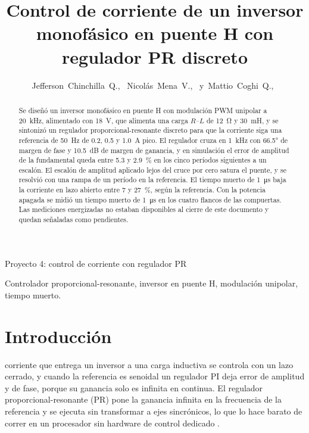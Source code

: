 \documentclass[journal]{IEEEtran}
\begin{document}
\deactivatequoting
\title{Control de corriente de un inversor monofásico en puente H con regulador PR discreto}

\author{Jefferson~Chinchilla~Q.,~
	Nicolás~Mena~V.,~
	y~Mattio~Coghi~Q.,~
}

%
{Proyecto 4: control de corriente con regulador PR}

\maketitle

\begin{abstract}
	Se diseñó un inversor monofásico en puente H con modulación PWM unipolar a \SI{20}{kHz}, alimentado con \SI{18}{V}, que alimenta una carga $R$--$L$ de \SI{12}{\ohm} y \SI{30}{mH}, y se sintonizó un regulador proporcional-resonante discreto para que la corriente siga una referencia de \SI{50}{Hz} de \num{0.2}, \num{0.5} y \SI{1.0}{A} pico. El regulador cruza en \SI{1}{kHz} con \ang{66.5} de margen de fase y \SI{10.5}{dB} de margen de ganancia, y en simulación el error de amplitud de la fundamental queda entre \num{5.3} y \SI{2.9}{\percent} en los cinco períodos siguientes a un escalón. El escalón de amplitud aplicado lejos del cruce por cero satura el puente, y se resolvió con una rampa de un período en la referencia. El tiempo muerto de \SI{1}{\micro s} baja la corriente en lazo abierto entre \num{7} y \SI{27}{\percent}, según la referencia. Con la potencia apagada se midió un tiempo muerto de \SI{1}{\micro s} en los cuatro flancos de las compuertas. Las mediciones energizadas no estaban disponibles al cierre de este documento y quedan señaladas como pendientes.
\end{abstract}

\begin{IEEEkeywords}
	Controlador proporcional-resonante, inversor en puente H, modulación unipolar, tiempo muerto.
\end{IEEEkeywords}

\section{Introducción}
\label{sec:intro}
 corriente que entrega un inversor a una carga inductiva se controla con un lazo cerrado, y cuando la referencia es senoidal un regulador PI deja error de amplitud y de fase, porque su ganancia solo es infinita en continua. El regulador proporcional-resonante (PR) pone la ganancia infinita en la frecuencia de la referencia y se ejecuta sin transformar a ejes sincrónicos, lo que lo hace barato de correr en un procesador sin hardware de control dedicado \cite{teodorescu2006}.
\end{document}
